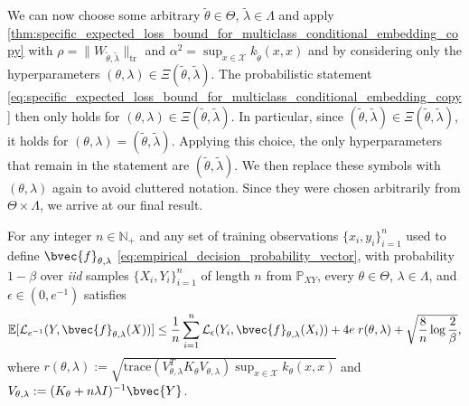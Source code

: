 \documentclass[runningheads, envcountsame, a4paper]{llncs}
\begin{document}
		We can now choose some arbitrary $\tilde{\theta} \in \Theta$, $\tilde{\lambda} \in \Lambda$ and apply \cref{thm:specific_expected_loss_bound_for_multiclass_conditional_embedding_copy} with $\rho = \| W_{\tilde{\theta}, \tilde{\lambda}} \|_{\mathrm{tr}}$ and $\alpha^{2} = \sup_{x \in \mathcal{X}} k_{\tilde{\theta}}(x, x)$ and by considering only the hyperparameters $(\theta, \lambda) \in \Xi(\tilde{\theta}, \tilde{\lambda})$. The probabilistic statement \eqref{eq:specific_expected_loss_bound_for_multiclass_conditional_embedding_copy} then only holds for $(\theta, \lambda) \in \Xi(\tilde{\theta}, \tilde{\lambda})$. In particular, since $(\tilde{\theta}, \tilde{\lambda}) \in \Xi(\tilde{\theta}, \tilde{\lambda})$, it holds for $(\theta, \lambda) = (\tilde{\theta}, \tilde{\lambda})$. Applying this choice, the only hyperparameters that remain in the statement are $(\tilde{\theta}, \tilde{\lambda})$. We then replace these symbols with $(\theta, \lambda)$ again to avoid cluttered notation. Since they were chosen arbitrarily from $ \Theta \times \Lambda$, we arrive at our final result.
		
		\begin{theorem}
			\label{thm:expected_risk_bound_hyperparameter_learning_copy}
			For any integer $n \in \mathbb{N}_{+}$ and any set of training observations $\{x_{i}, y_{i}\}_{i = 1}^{n}$ used to define $\bvec{f}_{\theta, \lambda}$ \eqref{eq:empirical_decision_probability_vector}, with probability $1 - \beta$ over \textit{iid} samples $\{X_{i}, Y_{i}\}_{i = 1}^{n}$ of length $n$ from $\mathbb{P}_{X Y}$, every $\theta \in \Theta$, $\lambda \in \Lambda$, and $\epsilon \in (0, e^{-1})$ satisfies
			\begin{equation}
			\begin{aligned}
			\mathbb{E}[\mathcal{L}_{e^{-1}}(Y, \bvec{f}_{\theta, \lambda}(X))] \leq \frac{1}{n} \sum_{i = 1}^{n} \mathcal{L}_{\epsilon}(Y_{i}, \bvec{f}_{\theta, \lambda}(X_{i})) + 4 e \; r(\theta, \lambda) + \sqrt{\frac{8}{n} \log{\frac{2}{\beta}}},
			\label{eq:expected_risk_bound_hyperparameter_learning_copy}
			\end{aligned}
			\end{equation}
			where $r(\theta, \lambda) := \sqrt{\mathrm{trace}(V_{\theta, \lambda}^{T} K_{\theta} V_{\theta, \lambda}) \sup_{x \in \mathcal{X}} k_{\theta}(x, x)}$ and $V_{\theta, \lambda} := (K_{\theta} + n \lambda I)^{-1} \bvec{Y}$.	
		\end{theorem}
		
\end{document}
